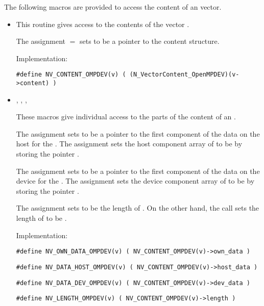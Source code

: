The following macros are provided to access the content of an {\nvecopenmpdev}
vector.
\begin{itemize}

\item {} 
    
  This routine gives access to the contents of the {\nvecopenmpdev}
  vector .
  
  The assignment  $=$  sets           
   to be a pointer to the {\nvecopenmpdev}  content  
  structure.                                             
                                                            
  Implementation: 
  
  \verb|#define NV_CONTENT_OMPDEV(v) ( (N_VectorContent_OpenMPDEV)(v->content) )|
  
\item {}, , , 

  These macros give individual access to the parts of    
  the content of an {\nvecopenmpdev} . 
                                                               
  The assignment  sets  to be     
  a pointer to the first component of the data on the host for the  . 
  The assignment  sets the host component array of  to     
  be  by storing the pointer .                   
  
  The assignment  sets  to be
  a pointer to the first component of the data on the device for the  . 
  The assignment  sets the device component array of  to     
  be  by storing the pointer .

  The assignment  sets  to be     
  the length of . On the other hand, the call  
  sets the length of  to be .
  
  Implementation: 
  
  \verb|#define NV_OWN_DATA_OMPDEV(v) ( NV_CONTENT_OMPDEV(v)->own_data )|

  \verb|#define NV_DATA_HOST_OMPDEV(v) ( NV_CONTENT_OMPDEV(v)->host_data )|
  
  \verb|#define NV_DATA_DEV_OMPDEV(v) ( NV_CONTENT_OMPDEV(v)->dev_data )|
  
  \verb|#define NV_LENGTH_OMPDEV(v) ( NV_CONTENT_OMPDEV(v)->length )|

\end{itemize}


